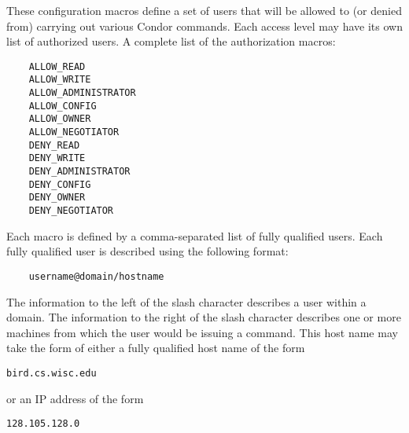 These configuration macros define a set of users that will be
allowed to (or denied from) carrying out various Condor commands.
Each access level may have its own list of authorized users.
A complete list of the authorization macros:
\begin{verbatim}
    ALLOW_READ
    ALLOW_WRITE
    ALLOW_ADMINISTRATOR
    ALLOW_CONFIG
    ALLOW_OWNER
    ALLOW_NEGOTIATOR
    DENY_READ
    DENY_WRITE
    DENY_ADMINISTRATOR
    DENY_CONFIG
    DENY_OWNER
    DENY_NEGOTIATOR
\end{verbatim}

Each macro is defined by a comma-separated list of fully qualified
users.
Each
fully qualified user
is described using the following format:
\begin{verbatim}
    username@domain/hostname
\end{verbatim}
The information to the left of the slash character describes
a user within a domain.
The information to the right of the slash character describes
one or more machines from which the user would be issuing a command. 
This host name may take the form of either a fully qualified host name
of the form
\begin{verbatim}
bird.cs.wisc.edu
\end{verbatim}
or an IP address
of the form
\begin{verbatim}
128.105.128.0
\end{verbatim}

